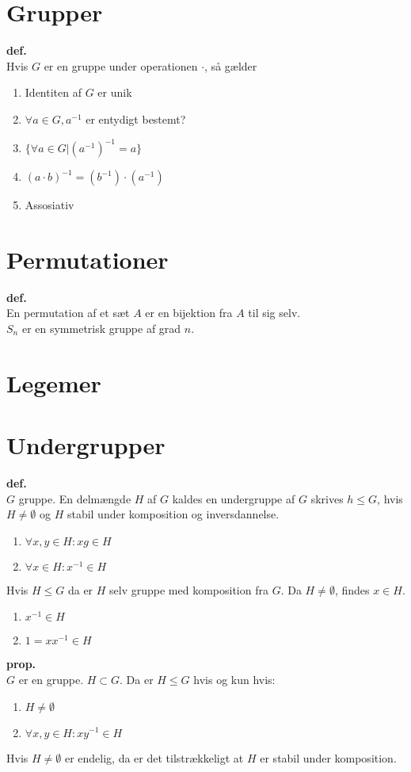 \documentclass{article}
\begin{document}
\section*{Grupper}
\textbf{def.}\\
Hvis $G$ er en gruppe under operationen $\cdot$, så gælder
\begin{enumerate}
\item Identiten af $G$ er unik
\item $\forall{a} \in G, a^{-1}$ er entydigt bestemt?
\item $\{ \forall{a} \in G | (a^{-1})^{-1} = a\}$
\item $(a \cdot b)^{-1} = (b^{-1}) \cdot (a^{-1})$
\item Assosiativ
\end{enumerate}

\section*{Permutationer}
\textbf{def.}\\
En permutation af et sæt $A$ er en bijektion fra $A$ til sig selv.\\
$S_n$ er en symmetrisk gruppe af grad $n$.

\section*{Legemer}


\section*{Undergrupper}
\textbf{def.}\\
$G$ gruppe. En delmængde $H$ af $G$ kaldes en undergruppe af $G$ skrives $h \leq G$, hvis $H \neq \emptyset$ og $H$ stabil under komposition og inversdannelse.
\begin{enumerate}
  \item $\forall{x, y} \in H : xg \in H$
  \item $\forall{x} \in H : x^{-1} \in H$
\end{enumerate}
Hvis $H \leq G$ da er $H$ selv gruppe med komposition fra $G$. Da $H \neq \emptyset$, findes $x \in H$.
\begin{enumerate}
  \item $x^{-1} \in H$
  \item $1 = x x^{-1} \in H$
\end{enumerate}
\textbf{prop.}\\
$G$ er en gruppe. $H \subset G$. Da er $H \leq G$ hvis og kun hvis:
\begin{enumerate}
  \item $H \neq \emptyset$
  \item $\forall{x, y} \in H : x y^{-1} \in H$
\end{enumerate}
Hvis $H \neq \emptyset$ er endelig, da er det tilstrækkeligt at $H$ er stabil under komposition.
\end{document}
